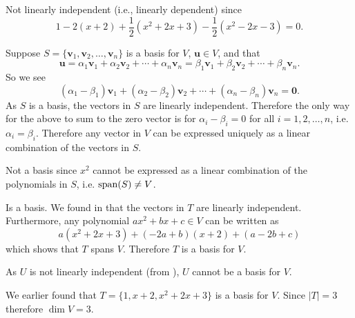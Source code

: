 \begin{questions}
\begin{partquestions}{\alph*}
        \item Not linearly independent (i.e., linearly dependent) since
        \[
            1 - 2(x+2) + \frac12(x^2 + 2x + 3) - \frac12(x^2 - 2x - 3) = 0.
        \]
    \end{partquestions}

    \item Suppose $S = \{\textbf{v}_1, \textbf{v}_2, \dots, \textbf{v}_n\}$ is a basis for $V$, $\textbf{u} \in V$, and that
    \[
        \textbf{u} = \alpha_1\textbf{v}_1 + \alpha_2\textbf{v}_2 + \cdots + \alpha_n\textbf{v}_n = \beta_1\textbf{v}_1 + \beta_2\textbf{v}_2 + \cdots + \beta_n\textbf{v}_n.
    \]
    So we see
    \[
        (\alpha_1 - \beta_1)\textbf{v}_1 + (\alpha_2 - \beta_2)\textbf{v}_2 + \cdots + (\alpha_n - \beta_n)\textbf{v}_n = \textbf{0}.
    \]
    As $S$ is a basis, the vectors in $S$ are linearly independent. Therefore the only way for the above to sum to the zero vector is for $\alpha_i - \beta_i = 0$ for all $i = 1, 2, \dots, n$, i.e. $\alpha_i = \beta_i$. Therefore any vector in $V$ can be expressed uniquely as a linear combination of the vectors in $S$.

    \item \begin{partquestions}{\alph*}
        \item Not a basis since $x^2$ cannot be expressed as a linear combination of the polynomials in $S$, i.e. $\mathrm{span}(S) \neq V$.

        \item Is a basis. We found in  that the vectors in $T$ are linearly independent. Furthermore, any polynomial $ax^2 + bx + c \in V$ can be written as
        \[
            a(x^2+2x+3) + (-2a+b)(x+2) + (a-2b+c)
        \]
        which shows that $T$ spans $V$. Therefore $T$ is a basis for $V$.

        \item As $U$ is not linearly independent (from ), $U$ cannot be a basis for $V$.
    \end{partquestions}

    \item We earlier found that $T = \{1, x + 2, x^2 + 2x + 3\}$ is a basis for $V$. Since $|T| = 3$ therefore $\dim{V} = 3$.
\end{questions}
